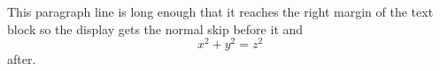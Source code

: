 \documentclass[10pt]{article}
\begin{document}
This paragraph line is long enough that it reaches the right margin of the text block so the display gets the normal skip before it and
\begin{equation} x^2 + y^2 = z^2 \end{equation}
after.
\end{document}
